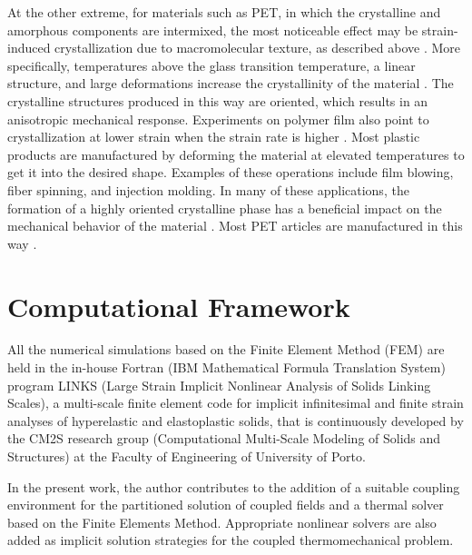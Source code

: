 At the other extreme, for materials such as PET, in which the crystalline and amorphous components are intermixed, the most noticeable effect may be strain-induced crystallization due to macromolecular texture, as described above \citep{wardIntroductionMechanicalProperties2004}.
More specifically, temperatures above the glass transition temperature, a linear structure, and large deformations increase the crystallinity of the material \citep{ahziModelingDeformationBehavior2003}.
The crystalline structures produced in this way are oriented, which results in an anisotropic mechanical response.
Experiments on polymer film also point to crystallization at lower strain when the strain rate is higher \citep{raoStudyStraininducedCrystallization2001}.
Most plastic products are manufactured by deforming the material at elevated temperatures to get it into the desired shape.
Examples of these operations include film blowing, fiber spinning, and injection molding.
In many of these applications, the formation of a highly oriented crystalline phase has a beneficial impact on the mechanical behavior of the material \citep{dairaniehPhenomenologicalModelFlowInduced1999, raoStudyStraininducedCrystallization2001}.
Most PET articles are manufactured in this way \citep{boyceConstitutiveModelFinite2000, raoStudyStraininducedCrystallization2001, makradiTwophaseSelfconsistentModel2005}.


\section{Computational Framework}

All the numerical simulations based on the Finite Element Method (FEM) are held in the in-house Fortran (IBM Mathematical Formula Translation System) program LINKS (Large Strain Implicit Nonlinear Analysis of Solids Linking Scales), a multi-scale finite element code for implicit infinitesimal and finite strain analyses of hyperelastic and elastoplastic solids, that is continuously developed by the CM2S research group (Computational Multi-Scale Modeling of Solids and Structures) at the Faculty of Engineering of University of Porto.

In the present work, the author contributes to the addition of a suitable coupling environment for the partitioned solution of coupled fields and a thermal solver based on the Finite Elements Method.
Appropriate nonlinear solvers are also added as implicit solution strategies for the coupled thermomechanical problem.

